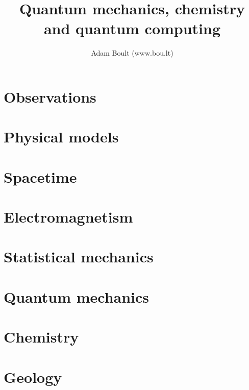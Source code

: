 \documentclass[oneside]{book}
\begin{document}
\author{Adam Boult (www.bou.lt)}
\title{Quantum mechanics, chemistry and quantum computing}
\maketitle

\setcounter{tocdepth}{0}
\tableofcontents



\part{Observations}

\part{Physical models}

\part{Spacetime}







\part{Electromagnetism}


\part{Statistical mechanics}


\part{Quantum mechanics}




\part{Chemistry}







\part{Geology}

\end{document}
